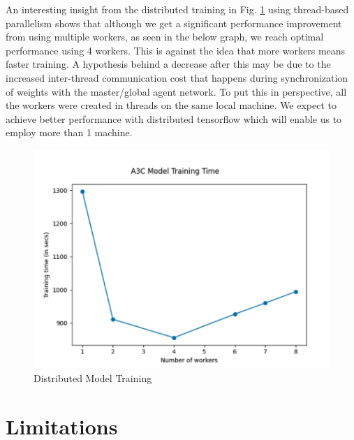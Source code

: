 \documentclass[conference]{IEEEtran}
\begin{document}
An interesting insight from the distributed training in Fig. \ref{multi_worker_graph} using thread-based parallelism shows that although we get a significant performance improvement from using multiple workers, as seen in the below graph, we reach optimal performance using 4 workers. This is against the idea that more workers means faster training. A hypothesis behind a decrease after this may be due to the increased inter-thread communication cost that happens during synchronization of weights with the master/global agent network. To put this in perspective, all the workers were created in threads on the same local machine. We expect to achieve better performance with distributed tensorflow which will enable us to employ more than 1 machine.

\begin{figure}[h!]
    \centering
    \includegraphics[width=\linewidth]{multi_worker.png}
    \caption{Distributed Model Training}
    \label{multi_worker_graph}
\end{figure}

\section{Limitations}

\end{document}
